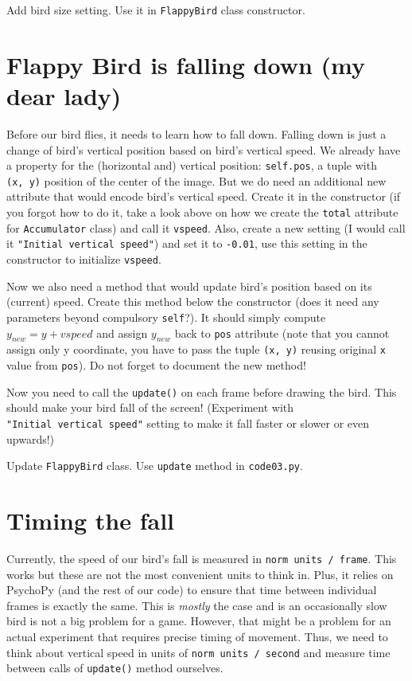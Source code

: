 \documentclass[
]{book}
\begin{document}
Add bird size setting.
Use it in \texttt{FlappyBird} class constructor.

\hypertarget{flappy-bird-is-falling-down-my-dear-lady}{%
\section{Flappy Bird is falling down (my dear lady)}\label{flappy-bird-is-falling-down-my-dear-lady}}

Before our bird flies, it needs to learn how to fall down. Falling down is just a change of bird's vertical position based on bird's vertical speed. We already have a property for the (horizontal and) vertical position: \texttt{self.pos}, a tuple with \texttt{(x,\ y)} position of the center of the image. But we do need an additional new attribute that would encode bird's vertical speed. Create it in the constructor (if you forgot how to do it, take a look above on how we create the \texttt{total} attribute for \texttt{Accumulator} class) and call it \texttt{vspeed}. Also, create a new setting (I would call it \texttt{"Initial\ vertical\ speed"}) and set it to \texttt{-0.01}, use this setting in the constructor to initialize \texttt{vspeed}.

Now we also need a method that would update bird's position based on its (current) speed. Create this method below the constructor (does it need any parameters beyond compulsory \texttt{self}?). It should simply compute \(y_{new} = y + vspeed\) and assign \(y_{new}\) back to \texttt{pos} attribute (note that you cannot assign only y coordinate, you have to pass the tuple \texttt{(x,\ y)} reusing original \texttt{x} value from \texttt{pos}). Do not forget to document the new method!

Now you need to call the \texttt{update()} on each frame before drawing the bird. This should make your bird fall of the screen! (Experiment with \texttt{"Initial\ vertical\ speed"} setting to make it fall faster or slower or even upwards!)

Update \texttt{FlappyBird} class.
Use \texttt{update} method in \texttt{code03.py}.

\hypertarget{timing-the-fall}{%
\section{Timing the fall}\label{timing-the-fall}}

Currently, the speed of our bird's fall is measured in \texttt{norm\ units\ /\ frame}. This works but these are not the most convenient units to think in. Plus, it relies on PsychoPy (and the rest of our code) to ensure that time between individual frames is exactly the same. This is \emph{mostly} the case and is an occasionally slow bird is not a big problem for a game. However, that might be a problem for an actual experiment that requires precise timing of movement. Thus, we need to think about vertical speed in units of \texttt{norm\ units\ /\ second} and measure time between calls of \texttt{update()} method ourselves.
\end{document}
